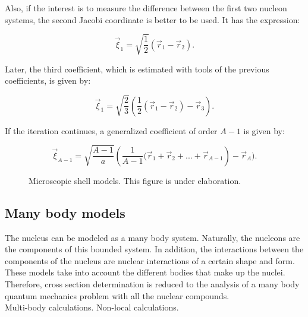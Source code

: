 \documentclass[openany]{book}
\begin{document}
Also, if the interest is to measure the difference between the first two nucleon systems, the second Jacobi coordinate is better to be used. It has the expression: 

\begin{equation}\label{eq:micro_NCSM_jacobi1}
	\vec \xi_1 = \sqrt{\frac{1}{2}} (\vec r_1 - \vec r_2).
\end{equation}

Later, the third coefficient, which is estimated with tools of the previous coefficients, is given by: 

\begin{equation}\label{eq:micro_NCSM_jacobi2}
	\vec \xi_1 = \sqrt{\frac{2}{3}} ( \frac{1}{2}(\vec r_1 - \vec r_2) - \vec r_3).
\end{equation}

If the iteration continues, a generalized coefficient of order $A - 1$ is given by: 

\begin{equation}\label{eq:micro_NCSM_jacobiA-1}
	\vec \xi_{A-1} = \sqrt{\frac{A-1}{a}} \left( \frac{1}{A-1}(\vec r_1 +  \vec r_2 + ... + \vec r_{A - 1} \right) - \vec r_A).
\end{equation}


\begin{figure}[H]
	
	\caption[Microscopic shell models]{Microscopic shell models. This figure is under elaboration.}
	\label{fig:microShellModels}
\end{figure}

\subsection{Many body models}  \label{sub:microscopical_manybody}

The nucleus can be modeled as a many body system. Naturally, the nucleons are the components of this bounded system. In addition, the interactions between the components of the nucleus are nuclear interactions of a certain shape and form.  \\

These models take into account the different bodies that make up the nuclei. \\

Therefore,  cross section determination is reduced to the analysis of a many body quantum mechanics problem with all the nuclear compounds. \\

Multi-body calculations.  Non-local calculations. \\
\end{document}
